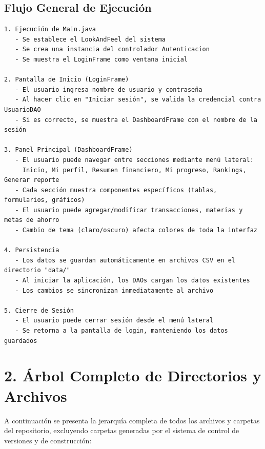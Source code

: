 \documentclass[utf8]{article}
\begin{document}
\subsection*{Flujo General de Ejecución}
\begin{verbatim}
1. Ejecución de Main.java
   - Se establece el LookAndFeel del sistema
   - Se crea una instancia del controlador Autenticacion
   - Se muestra el LoginFrame como ventana inicial

2. Pantalla de Inicio (LoginFrame)
   - El usuario ingresa nombre de usuario y contraseña
   - Al hacer clic en "Iniciar sesión", se valida la credencial contra UsuarioDAO
   - Si es correcto, se muestra el DashboardFrame con el nombre de la sesión

3. Panel Principal (DashboardFrame)
   - El usuario puede navegar entre secciones mediante menú lateral:
     Inicio, Mi perfil, Resumen financiero, Mi progreso, Rankings, Generar reporte
   - Cada sección muestra componentes específicos (tablas, formularios, gráficos)
   - El usuario puede agregar/modificar transacciones, materias y metas de ahorro
   - Cambio de tema (claro/oscuro) afecta colores de toda la interfaz

4. Persistencia
   - Los datos se guardan automáticamente en archivos CSV en el directorio "data/"
   - Al iniciar la aplicación, los DAOs cargan los datos existentes
   - Los cambios se sincronizan inmediatamente al archivo

5. Cierre de Sesión
   - El usuario puede cerrar sesión desde el menú lateral
   - Se retorna a la pantalla de login, manteniendo los datos guardados
\end{verbatim}

\section*{2. Árbol Completo de Directorios y Archivos}

A continuación se presenta la jerarquía completa de todos los archivos y carpetas del repositorio, excluyendo carpetas generadas por el sistema de control de versiones y de construcción:
\end{document}
